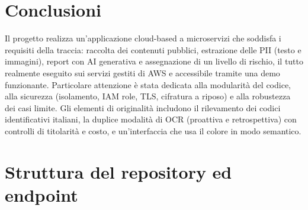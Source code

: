 \documentclass[11pt,a4paper]{article}
\begin{document}
\section{Conclusioni}
Il progetto realizza un'applicazione cloud-based a microservizi che soddisfa i
requisiti della traccia: raccolta dei contenuti pubblici, estrazione delle PII (testo e
immagini), report con AI generativa e assegnazione di un livello di rischio, il tutto
realmente eseguito sui servizi gestiti di AWS e accessibile tramite una demo
funzionante. Particolare attenzione è stata dedicata alla modularità del codice, alla
sicurezza (isolamento, IAM role, TLS, cifratura a riposo) e alla robustezza dei casi
limite. Gli elementi di originalità includono il rilevamento dei codici identificativi
italiani, la duplice modalità di OCR (proattiva e retrospettiva) con controlli di
titolarità e costo, e un'interfaccia che usa il colore in modo semantico.

\appendix
\section{Struttura del repository ed endpoint}
\end{document}
